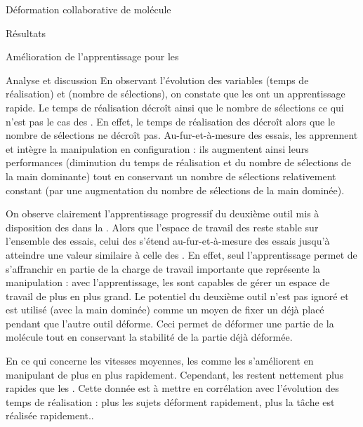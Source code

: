 \documentclass[myfrancais,ngerman,english,frenchb]{mythesis}
\begin{document}
\begin{mychapter}{Déformation collaborative de molécule}
\begin{mysection}{Résultats}
\begin{mysubsection}{Amélioration de l'apprentissage pour les }
\begin{mysubsubsection}{Analyse et discussion}
					En observant l'évolution des variables  (temps de réalisation) et  (nombre de sélections), on constate que les  ont un apprentissage rapide.
					Le temps de réalisation décroît ainsi que le nombre de sélections ce qui n'est pas le cas des .
					En effet, le temps de réalisation des  décroît alors que le nombre de sélections ne décroît pas.
					Au-fur-et-à-mesure des essais, les  apprennent et intègre la manipulation en configuration  : ils augmentent ainsi leurs performances (diminution du temps de réalisation et du nombre de sélections de la main dominante) tout en conservant un nombre de sélections relativement constant (par une augmentation du nombre de sélections de la main dominée).

					On observe clairement l'apprentissage progressif du deuxième outil mis à disposition des  dans la .
					Alors que l'espace de travail des  reste stable sur l'ensemble des essais, celui des  s'étend au-fur-et-à-mesure des essais jusqu'à atteindre une valeur similaire à celle des .
					En effet, seul l'apprentissage permet de s'affranchir en partie de la charge de travail importante que représente la manipulation   : avec l'apprentissage, les  sont capables de gérer un espace de travail de plus en plus grand.
					Le potentiel du deuxième outil n'est pas ignoré et est utilisé (avec la main dominée) comme un moyen de fixer un  déjà placé pendant que l'autre outil déforme.
					Ceci permet de déformer une partie de la molécule tout en conservant la stabilité de la partie déjà déformée.

					En ce qui concerne les vitesses moyennes, les  comme les  s'améliorent en manipulant de plus en plus rapidement.
					Cependant, les  restent nettement plus rapides que les .
					Cette donnée est à mettre en corrélation avec l'évolution des temps de réalisation : plus les sujets déforment rapidement, plus la tâche est réalisée rapidement..


\end{mysubsubsection}
\end{mysubsection}
\end{mysection}
\end{mychapter}
\end{document}
